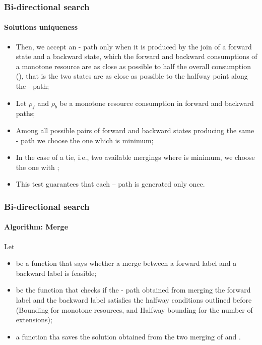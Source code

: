 \begin{frame}
  \frametitle{Bi-directional search}
  \framesubtitle{Solutions uniqueness}
  \begin{itemize}
    \item Then, we accept an - path only when it is produced by the join of a forward state and a backward state,
      which the forward and backward consumptions of a monotone resource are as close as possible to half the overall consumption (),
      that is the two states are as close as possible to the halfway point along the - path;
    \item Let $\rho_f$ and $\rho_b$ be a monotone resource consumption in forward and backward paths;
    \item Among all possible pairs of forward and backward states producing the same - path we choose the one which  is minimum;
    \item In the case of a tie, i.e., two available mergings where \blue{$\psi$} is minimum, we choose the one with ;
    \item This test guarantees that each – path is generated only once.
  \end{itemize}
\end{frame}

\begin{frame}
  \frametitle{Bi-directional search}
  \framesubtitle{Algorithm: Merge}
  Let
  \begin{itemize}
    \item \blue{\[
        f(S_i, S_j) =  
        \begin{cases}
        \text{\textcolor{black}{true}},  & \text{\textcolor{black}{if} } \forall r \in R (l^r_j - d_{ij}^r \leqslant e_i^r) \wedge \\
                                         & (v_i^1, ..., v_i^{|V|}) \implies \neg (v_j^1, ..., v_j^{|V|})\\
          \text{\textcolor{black}{false}}, & \text{\textcolor{black}{otherwise}}
        \end{cases}
    \]} be a function that says whether a merge between a forward label  and a backward label  is feasible;
    \item {} be the function that checks if the - path obtained from merging the forward label  and the backward label  satisfies the halfway conditions outlined before (Bounding for monotone resources, and Halfway bounding for the number of extensions);
    \item {} a function tha saves the solution obtained from the two merging of  and .
  \end{itemize}
\end{frame}

